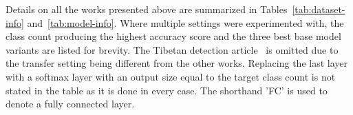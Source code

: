 \documentclass[english,twoside,openright]{UH_DS_MSc}
\begin{document}
Details on all the works presented above are summarized in Tables~\ref{tab:dataset-info} and~\ref{tab:model-info}. Where multiple settings 
were experimented with, the class count producing the highest accuracy score and the three best 
base model variants are listed for brevity. The Tibetan detection article~\cite{4zhaoTibetan}
is omitted due to the transfer setting being different from the other works. Replacing the last layer with a 
softmax layer with an output size equal to the target class count is not 
stated in the table as it is done in every case. The shorthand 'FC' is used to denote a fully connected layer.

\begin{table}[h!]
\centering
{}
\caption{Literature Summary: Datasets}
\label{tab:dataset-info}
\end{table}
\end{document}
